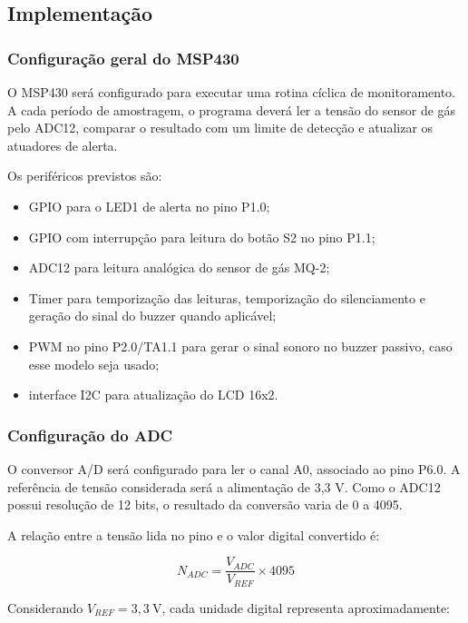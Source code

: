 \documentclass[11pt,a4paper]{article}
\numberwithin{equation}{section}
\begin{document}
\subsection{Implementação}

\subsubsection{Configuração geral do MSP430}

O MSP430 será configurado para executar uma rotina cíclica de monitoramento. A cada período de
amostragem, o programa deverá ler a tensão do sensor de gás pelo ADC12, comparar o resultado com um
limite de detecção e atualizar os atuadores de alerta.

Os periféricos previstos são:

\begin{itemize}
  \item GPIO para o LED1 de alerta no pino P1.0;
  \item GPIO com interrupção para leitura do botão S2 no pino P1.1;
  \item ADC12 para leitura analógica do sensor de gás MQ-2;
  \item Timer para temporização das leituras, temporização do silenciamento e geração do sinal do
        buzzer quando aplicável;
  \item PWM no pino P2.0/TA1.1 para gerar o sinal sonoro no buzzer passivo, caso esse modelo seja usado;
  \item interface I2C para atualização do LCD 16x2.
\end{itemize}

\subsubsection{Configuração do ADC}

O conversor A/D será configurado para ler o canal A0, associado ao pino P6.0. A referência de tensão
considerada será a alimentação de 3,3 V. Como o ADC12 possui resolução de 12 bits, o resultado da
conversão varia de 0 a 4095.

A relação entre a tensão lida no pino e o valor digital convertido é:

\begin{equation}
  N_{ADC} = \frac{V_{ADC}}{V_{REF}} \times 4095
  \label{eq:adc}
\end{equation}

Considerando $V_{REF} = 3{,}3\ \text{V}$, cada unidade digital representa aproximadamente:
\end{document}
